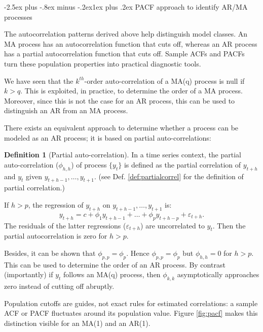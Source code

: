 \documentclass[
  11pt,
]{book}
\makeatletter
\renewcommand\subsection{\@startsection{subsection}{2}{\z@}
  {-2.5ex plus -.8ex minus -.2ex}{1ex plus .2ex}
  {\normalfont\large\bfseries\color{TextbookInk}}}
\theoremstyle{definition}
\newtheorem{definition}{Definition}[chapter]
\theoremstyle{definition}
\theoremstyle{definition}
\theoremstyle{definition}
\theoremstyle{remark}
\makeatother
\begin{document}
\subsection{PACF approach to identify AR/MA processes}\label{PACFapproach}

The autocorrelation patterns derived above help distinguish model classes. An MA process has an autocorrelation function that cuts off, whereas an AR process has a partial autocorrelation function that cuts off. Sample ACFs and PACFs turn these population properties into practical diagnostic tools.

We have seen that the \(k^{th}\)-order auto-correlation of a MA(q) process is null if \(k>q\). This is exploited, in practice, to determine the order of a MA process. Moreover, since this is not the case for an AR process, this can be used to distinguish an AR from an MA process.

There exists an equivalent approach to determine whether a process can be modeled as an AR process; it is based on partial auto-correlations:

\begin{definition}[Partial auto-correlation]
\protect\hypertarget{def:partialAC}{}\label{def:partialAC}In a time series context, the partial auto-correlation (\(\phi_{h,h}\)) of process \(\{y_t\}\) is defined as the partial correlation of \(y_{t+h}\) and \(y_t\) given \(y_{t+h-1},\dots,y_{t+1}\). (see Def. \ref{def:partialcorrel} for the definition of partial correlation.)
\end{definition}

If \(h>p\), the regression of \(y_{t+h}\) on \(y_{t+h-1},\dots,y_{t+1}\) is:
\[
y_{t+h} = c + \phi_1 y_{t+h-1}+\dots+ \phi_p  y_{t+h-p} + \varepsilon_{t+h}.
\]
The residuals of the latter regressions (\(\varepsilon_{t+h}\)) are uncorrelated to \(y_t\). Then the partial autocorrelation is zero for \(h>p\).

Besides, it can be shown that \(\phi_{p,p}=\phi_p\). Hence \(\phi_{p,p}=\phi_p\) but \(\phi_{h,h}=0\) for \(h>p\). This can be used to determine the order of an AR process. By contrast (importantly) if \(y_t\) follows an MA(q) process, then \(\phi_{k,k}\) asymptotically approaches zero instead of cutting off abruptly.

Population cutoffs are guides, not exact rules for estimated correlations: a sample ACF or PACF fluctuates around its population value. Figure \ref{fig:pacf} makes this distinction visible for an MA(1) and an AR(1).
\end{document}

